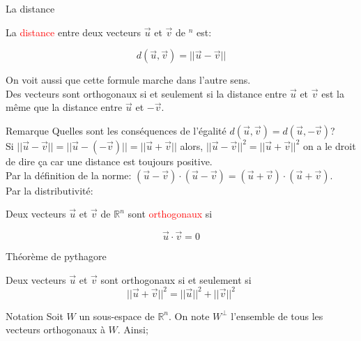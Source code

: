 \begin{parag}{La distance}
    \begin{definition}
        La \textcolor{red}{distance} entre deux vecteurs $\vec{u}$ et $\vec{v}$ de \R$^n$ est:
        \begin{formule}
            \[d(\vec{u}, \vec{v}) = ||\vec{u} - \vec{v}||\]
        \end{formule}
    \end{definition}
    \begin{framedremark}
        On voit aussi que cette formule marche dans l'autre sens.\\
        Des vecteurs sont orthogonaux si et seulement si la distance entre $\vec{u}$ et $\vec{v}$ est la même que la distance entre $\vec{u}$ et $-\vec{v}$.
    \end{framedremark}
    \begin{subparag}{Remarque}
        Quelles sont les conséquences de l'égalité $d(\vec
        {u}, \vec{v}) = d(\vec{u}, -\vec{v})$?\\
        Si $||\vec{u} - \vec{v}|| = ||\vec{u} - (-\vec{v})|| = || \vec{u}+\vec{v}||$ alors, $||\vec{u}-\vec{v}||^2 = ||\vec{u} + \vec{v}||^2$ on a le droit de dire ça car une distance est toujours positive.
        \\
        Par la définition de la norme:
        $(\vec{u} - \vec{v})\cdot(\vec{u}-\vec{v}) = (\vec{u}+\vec{v})\cdot(\vec{u}+\vec{v})$.
        \\
        Par la distributivité:
        \[\]
    \end{subparag}
    \begin{definition}
        Deux vecteurs $\vec{u}$ et $\vec{v}$ de $\mathbb{R}^n$ sont \textcolor{red}{orthogonaux} si 
        \begin{formule}
            \[\vec{u}\cdot \vec{v} = 0\]
        \end{formule}
    \end{definition}
        \begin{subparag}{Théorème de pythagore}
            \begin{theoreme}
                Deux vecteurs $\vec{u}$ et $\vec{v}$ sont orthogonaux si et seulement si 
                \[||\vec{u}+\vec{v}||^2 = ||\vec{u}||^2 + ||\vec{v}||^2\]
            \end{theoreme}
        \end{subparag}
        \begin{subparag}{Notation}
            Soit $W$ un sous-espace de $\mathbb{R}^n$. On note $W^\perp$ l'ensemble de tous les vecteurs orthogonaux à $W$. Ainsi;

\end{subparag}
\end{parag}
